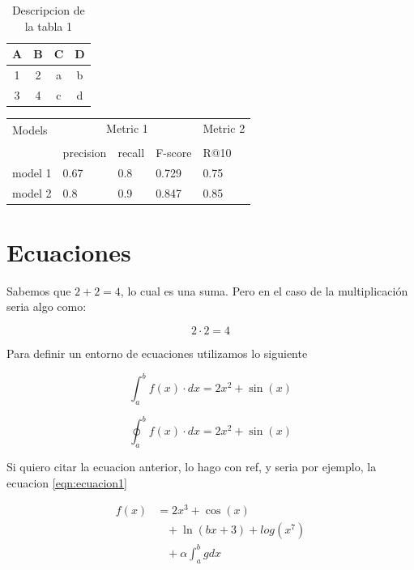 \documentclass[12pt, letterpaper]{article}
\begin{document}
\begin{table}[h]
    \centering
    \begin{tabular}{cccc}
        \toprule
        A & B & C & D \\ \midrule
        1 & 2 & a & b \\ \midrule
        3 & 4 & c & d \\ 
        \bottomrule
    \end{tabular}
    \caption{Descripcion de la tabla 1}
    \label{tab:tabla1}
\end{table}

\blindtext

\begin{table}[H]
    \centering
    \begin{tabular}{lllll}
        \toprule
        \multirow{2}{*}{Models} & \multicolumn{3}{c}{Metric 1} & Metric 2\\
        \cmidrule{2-4} \cmidrule{5-5} \\
        {} & precision & recall & F-score  & R@10 \\
        \midrule
        model 1 & 0.67  & 0.8 & 0.729  & 0.75 \\
        model 2 & 0.8 & 0.9 & 0.847 & 0.85 \\
        \bottomrule
    \end{tabular}
\end{table}
\section{Ecuaciones}
Sabemos que $2+2=4$, lo cual es una suma. Pero en el caso de la multiplicación seria algo como:

$$ 2\cdot 2 = 4 $$

Para definir un entorno de ecuaciones utilizamos lo siguiente

\begin{equation}
    \int_{a}^{b} f(x)\cdot dx = 2x^2+\sin(x)
    \label{eqn:ecuacion1}
\end{equation}

\begin{equation*}
    \oint_{a}^{b} f(x)\cdot dx = 2x^2+\sin(x)
    \label{eqn:ecuacion2}
\end{equation*}

Si quiero citar la ecuacion anterior, lo hago con ref, y seria por ejemplo, la ecuacion \ref{eqn:ecuacion1}

\begin{align}
    f(x) &= 2x^3+\cos(x) \\
         & \hspace{10pt} + \ln(bx+3) +log(x^7) \\ 
         & \hspace{10pt} + \alpha\int_a^b g dx 
\end{align}
\end{document}
